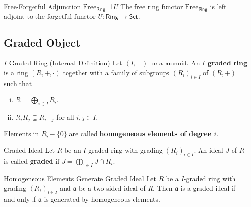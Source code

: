 \begin{proposition}{Free-Forgetful Adjunction $\mathrm{Free}_{\mathsf{Ring}}\dashv U$}{}
    The free ring functor $\mathrm{Free}_{\mathsf{Ring}}$ is left adjoint to the forgetful functor $U:\mathsf{Ring}\to\mathsf{Set}$.
\end{proposition}




\subsection{Graded Object}
\begin{definition}{$I$-Graded Ring (Internal Definition)}{}
    Let $(I,+)$ be a monoid. An \textbf{$I$-graded ring} is a ring $(R,+,\cdot)$ together with a family of subgroups $(R_i)_{i\in I}$ of $(R,+)$ such that
    \begin{enumerate}[(i)]
        \item $R=\bigoplus_{i\in I}R_i$.
        \item $R_iR_j\subseteq R_{i+j}$ for all $i,j\in I$.
    \end{enumerate}
    Elements in $R_i-\{0\}$ are called \textbf{homogeneous elements of degree $i$}.
\end{definition}

\begin{definition}{Graded Ideal}{}
    Let $R$ be an $I$-graded ring with grading $(R_i)_{i\in I}$. An ideal $J$ of $R$ is called \textbf{graded} if $J=\bigoplus_{i\in I}J\cap R_i$.
\end{definition}

\begin{proposition}{Homogeneous Elements Generate Graded Ideal}{}
    Let $R$ be a $I$-graded ring with grading $(R_i)_{i\in I}$ and $\mathfrak{a}$ be a two-sided ideal of $R$. Then $\mathfrak{a}$ is a graded ideal if and only if $\mathfrak{a}$ is generated by homogeneous elements.
\end{proposition}

